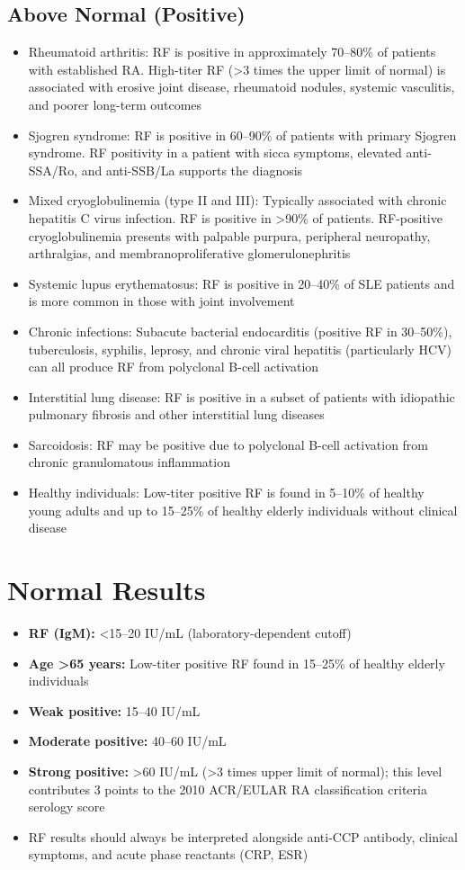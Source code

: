 \subsection*{Above Normal (Positive)}
\begin{itemize}
  \item Rheumatoid arthritis: RF is positive in approximately 70--80\% of patients with established RA. High-titer RF (>3 times the upper limit of normal) is associated with erosive joint disease, rheumatoid nodules, systemic vasculitis, and poorer long-term outcomes
  \item Sjogren syndrome: RF is positive in 60--90\% of patients with primary Sjogren syndrome. RF positivity in a patient with sicca symptoms, elevated anti-SSA/Ro, and anti-SSB/La supports the diagnosis
  \item Mixed cryoglobulinemia (type II and III): Typically associated with chronic hepatitis C virus infection. RF is positive in >90\% of patients. RF-positive cryoglobulinemia presents with palpable purpura, peripheral neuropathy, arthralgias, and membranoproliferative glomerulonephritis
  \item Systemic lupus erythematosus: RF is positive in 20--40\% of SLE patients and is more common in those with joint involvement
  \item Chronic infections: Subacute bacterial endocarditis (positive RF in 30--50\%), tuberculosis, syphilis, leprosy, and chronic viral hepatitis (particularly HCV) can all produce RF from polyclonal B-cell activation
  \item Interstitial lung disease: RF is positive in a subset of patients with idiopathic pulmonary fibrosis and other interstitial lung diseases
  \item Sarcoidosis: RF may be positive due to polyclonal B-cell activation from chronic granulomatous inflammation
  \item Healthy individuals: Low-titer positive RF is found in 5--10\% of healthy young adults and up to 15--25\% of healthy elderly individuals without clinical disease
\end{itemize}

\section*{Normal Results}
\begin{itemize}
  \item \textbf{RF (IgM):} <15--20 IU/mL (laboratory-dependent cutoff)
  \item \textbf{Age >65 years:} Low-titer positive RF found in 15--25\% of healthy elderly individuals
  \item \textbf{Weak positive:} 15--40 IU/mL
  \item \textbf{Moderate positive:} 40--60 IU/mL
  \item \textbf{Strong positive:} >60 IU/mL (>3 times upper limit of normal); this level contributes 3 points to the 2010 ACR/EULAR RA classification criteria serology score
  \item RF results should always be interpreted alongside anti-CCP antibody, clinical symptoms, and acute phase reactants (CRP, ESR)
\end{itemize}


